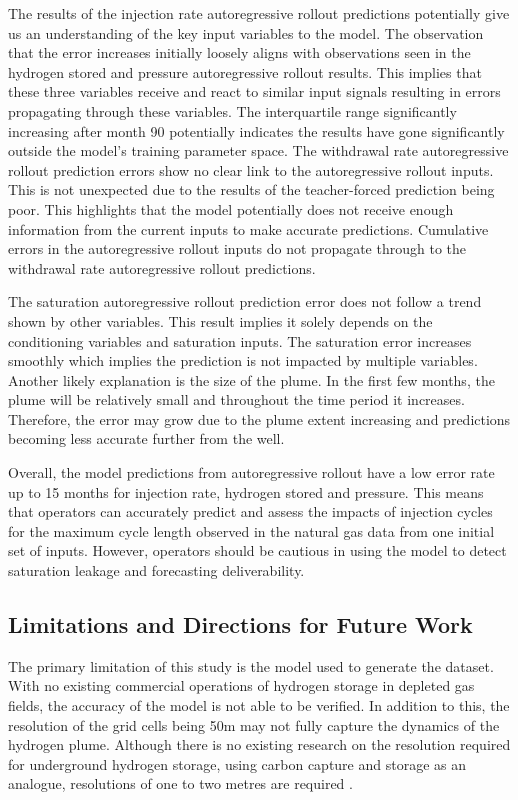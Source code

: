 The results of the injection rate autoregressive rollout predictions potentially give us an understanding of the key input variables to the model. The observation that the error increases initially loosely aligns with observations seen in the hydrogen stored and pressure autoregressive rollout results. This implies that these three variables receive and react to similar input signals resulting in errors propagating through these variables. The interquartile range significantly increasing after month 90 potentially indicates the results have gone significantly outside the model's training parameter space. The withdrawal rate autoregressive rollout prediction errors show no clear link to the autoregressive rollout inputs. This is not unexpected due to the results of the teacher-forced prediction being poor. This highlights that the model potentially does not receive enough information from the current inputs to make accurate predictions. Cumulative errors in the autoregressive rollout inputs do not propagate through to the withdrawal rate autoregressive rollout predictions. 

The saturation autoregressive rollout prediction error does not follow a trend shown by other variables. This result implies it solely depends on the conditioning variables and saturation inputs.  The saturation error increases smoothly which implies the prediction is not impacted by multiple variables. Another likely explanation is the size of the plume. In the first few months, the plume will be relatively small and throughout the time period it increases. Therefore, the error may grow due to the plume extent increasing and predictions becoming less accurate further from the well.

Overall, the model predictions from autoregressive rollout have a low error rate up to 15 months for injection rate, hydrogen stored and pressure. This means that operators can accurately predict and assess the impacts of injection cycles for the maximum cycle length observed in the natural gas data from one initial set of inputs. However, operators should be cautious in using the model to detect saturation leakage and forecasting deliverability.


\subsection{Limitations and Directions for Future Work}

The primary limitation of this study is the model used to generate the dataset. With no existing commercial operations of hydrogen storage in depleted gas fields, the accuracy of the model is not able to be verified. In addition to this, the resolution of the grid cells being 50m may not fully capture the dynamics of the hydrogen plume. Although there is no existing research on the resolution required for underground hydrogen storage, using carbon capture and storage as an analogue, resolutions of one to two metres are required \citep{gegewen_nested}. 

